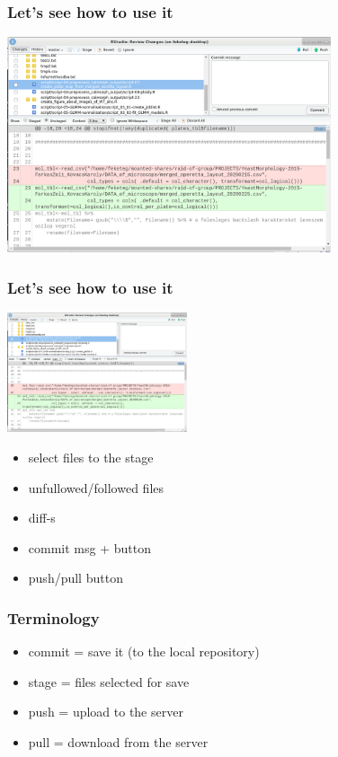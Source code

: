 \documentclass[aspectratio=169]{beamer}
\begin{document}
\begin{frame}
\frametitle<presentation>{Let's see how to use it}
\includegraphics[height=180pt]{pictures/Screenshot_2020-02-26_08-48-52-rstudio-commit-window-zoom_in.png}

\end{frame}

\begin{frame}
\frametitle<presentation>{Let's see how to use it}
\includegraphics[height=100pt]{pictures/Screenshot_2020-02-26_08-48-52-rstudio-commit-window-zoom_in.png}

\begin{itemize}
  		\item select files to the stage
  		\item unfullowed/followed files
		\item diff-s 
		\item commit msg + button
		\item push/pull button
	\end{itemize}
\end{frame}

\begin{frame}
\frametitle<presentation>{Terminology}

\begin{itemize}
  		\item commit = save it (to the local repository)
  		\item stage = files selected for save
		\item push = upload to the server 
		\item pull = download from the server
	\end{itemize}
\end{frame}
\end{document}
